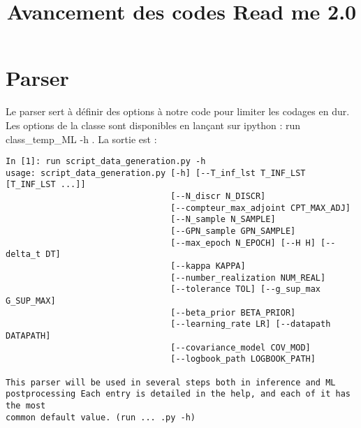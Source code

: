 \documentclass[a4paper,12pt]{article}
\title{Avancement des codes Read me 2.0 }%
\date{}
\newcommand\bk{\color{black}}
\newcommand\brick{\color{brick}}
\numberwithin{equation}{section} %
\begin{document}
\maketitle
\section*{Parser}
Le parser sert à définir des options à notre code pour limiter les codages en dur.\\
\noindent Les options de la classe sont disponibles en lançant sur ipython : \brick run class\_temp\_ML -h \bk. La sortie est : 

\begin{lstlisting}
In [1]: run script_data_generation.py -h
usage: script_data_generation.py [-h] [--T_inf_lst T_INF_LST [T_INF_LST ...]]
                                 [--N_discr N_DISCR]
                                 [--compteur_max_adjoint CPT_MAX_ADJ]
                                 [--N_sample N_SAMPLE]
                                 [--GPN_sample GPN_SAMPLE]
                                 [--max_epoch N_EPOCH] [--H H] [--delta_t DT]
                                 [--kappa KAPPA]
                                 [--number_realization NUM_REAL]
                                 [--tolerance TOL] [--g_sup_max G_SUP_MAX]
                                 [--beta_prior BETA_PRIOR]
                                 [--learning_rate LR] [--datapath DATAPATH]
                                 [--covariance_model COV_MOD]
                                 [--logbook_path LOGBOOK_PATH]

This parser will be used in several steps both in inference and ML
postprocessing Each entry is detailed in the help, and each of it has the most
common default value. (run ... .py -h)


\end{lstlisting}
\end{document}
